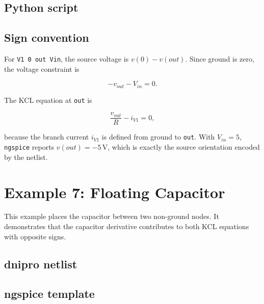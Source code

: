 \documentclass[11pt,a4paper]{article}
\newcommand{\code}[1]{\texttt{#1}}
\newcommand{\ngspice}{\texttt{ngspice}}
\begin{document}


\subsection{Python script}



\subsection{Sign convention}

For \code{V1 0 out Vin}, the source voltage is \(v(0)-v(out)\). Since ground is
zero, the voltage constraint is

\begin{equation}
    -v_{out} - V_{in} = 0.
\end{equation}

The KCL equation at \code{out} is

\begin{equation}
    \frac{v_{out}}{R} - i_{V1} = 0,
\end{equation}

because the branch current \(i_{V1}\) is defined from ground to \code{out}. With
\(V_{in}=5\), \ngspice{} reports \(v(out)=-5\,\mathrm{V}\), which is exactly the
source orientation encoded by the netlist.

\section{Example 7: Floating Capacitor}
\label{sec:ex-floating-capacitor}

This example places the capacitor between two non-ground nodes. It demonstrates
that the capacitor derivative contributes to both KCL equations with opposite
signs.

\subsection{dnipro netlist}



\subsection{ngspice template}
\end{document}
